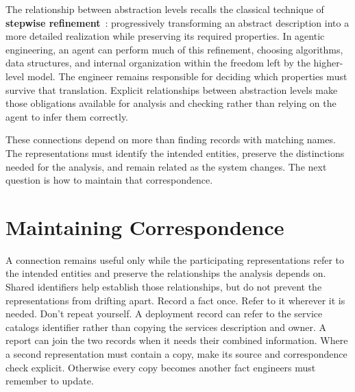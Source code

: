 The relationship between abstraction levels recalls the classical technique of \textbf{stepwise refinement}~\citep{wirth1971program}: progressively transforming an abstract description into a more detailed realization while preserving its required properties. In agentic engineering, an agent can perform much of this refinement, choosing algorithms, data structures, and internal organization within the freedom left by the higher-level model. The engineer remains responsible for deciding which properties must survive that translation. Explicit relationships between abstraction levels make those obligations available for analysis and checking rather than relying on the agent to infer them correctly.

These connections depend on more than finding records with matching names. The representations must identify the intended entities, preserve the distinctions needed for the analysis, and remain related as the system changes. The next question is how to maintain that correspondence.

\section{Maintaining Correspondence}\label{heading:maintaining-correspondence}




A connection remains useful only while the participating representations refer to the intended entities and preserve the relationships the analysis depends on. Shared identifiers help establish those relationships, but do not prevent the representations from drifting apart. Record a fact once. Refer to it wherever it is needed. Don't repeat yourself. A deployment record can refer to the service catalog\textquotesingle s identifier rather than copying the service\textquotesingle s description and owner. A report can join the two records when it needs their combined information. Where a second representation must contain a copy, make its source and correspondence check explicit. Otherwise every copy becomes another fact engineers must remember to update.

